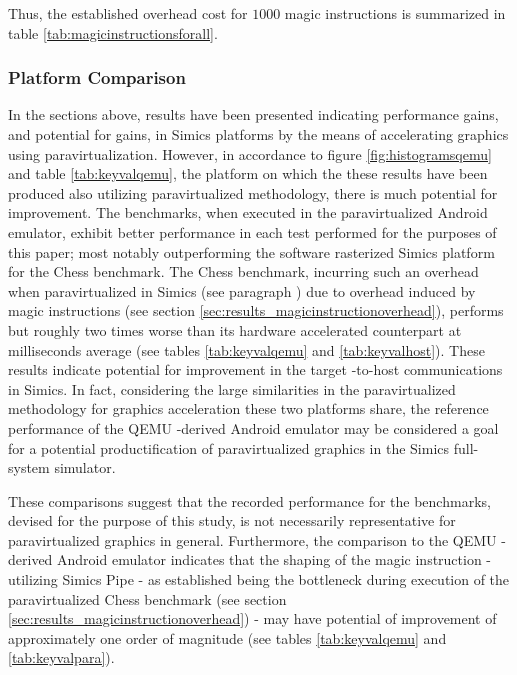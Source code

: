 Thus, the established overhead cost for $1000$ magic instructions is summarized in table \ref{tab:magicinstructionsforall}.

\subsubsection{Platform Comparison}
\label{sec:analysisexperiment_platformcomparison}
In the sections above, results have been presented indicating performance gains, and potential for gains, in Simics platforms by the means of accelerating graphics using paravirtualization.
However, in accordance to figure \ref{fig:histogramsqemu} and table \ref{tab:keyvalqemu}, the platform on which the these results have been produced also utilizing paravirtualized methodology, there is much potential for improvement.
The benchmarks, when executed in the paravirtualized Android emulator, exhibit better performance in each test performed for the purposes of this paper; most notably outperforming the software rasterized Simics platform for the Chess benchmark.
The Chess benchmark, incurring such an overhead when paravirtualized in Simics (see paragraph ) due to overhead induced by magic instructions (see section \ref{sec:results_magicinstructionoverhead}), performs but roughly two times worse than its hardware accelerated counterpart at  milliseconds average (see tables \ref{tab:keyvalqemu} and \ref{tab:keyvalhost}).
These results indicate potential for improvement in the target -to-host communications in Simics.
In fact, considering the large similarities in the paravirtualized methodology for graphics acceleration these two platforms share, the reference performance of the QEMU -derived Android emulator may be considered a goal for a potential productification of paravirtualized graphics in the Simics full-system simulator.

These comparisons suggest that the recorded performance for the benchmarks, devised for the purpose of this study, is not necessarily representative for paravirtualized graphics in general.
Furthermore, the comparison to the QEMU -derived Android emulator indicates that the shaping of the magic instruction -utilizing Simics Pipe - as established being the bottleneck during execution of the paravirtualized Chess benchmark (see section \ref{sec:results_magicinstructionoverhead}) - may have potential of improvement of approximately one order of magnitude (see tables \ref{tab:keyvalqemu} and \ref{tab:keyvalpara}).

